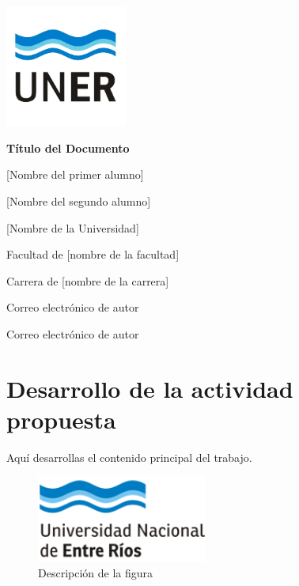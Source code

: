 \documentclass[a4paper,10pt]{article}
\begin{document}
	\pagestyle{empty}
	\begin{titlepage}
		\centering
		\vspace*{1.5cm}
		\includegraphics[width=0.3\textwidth]{unerlogo.png}
		\linebreak
		{\fontsize{14}{17}\bfseries Título del Documento\par}
		{\small [Nombre del primer alumno]\par}
		{\small [Nombre del segundo alumno]\par}
		{\normalsize [Nombre de la Universidad]\par}
		{\normalsize Facultad de [nombre de la facultad]\par}
		{\normalsize Carrera de [nombre de la carrera]\par}
		{\small Correo electrónico de autor\par}
		{\small Correo electrónico de autor\par}
		
	\end{titlepage}
	
	\tableofcontents
	\thispagestyle{empty}
	\clearpage
	\listoffigures
	\thispagestyle{empty}
	\clearpage
	
	\section{Desarrollo de la actividad propuesta}
	Aquí desarrollas el contenido principal del trabajo. \parencite{marquez2011metaversos}
	
	\begin{figure}[h]
		\centering
		\includegraphics[width=0.5\textwidth]{uner.png}
		\caption{Descripción de la figura}
		\label{fig:ejemplo}
	\end{figure}
	
\end{document}
